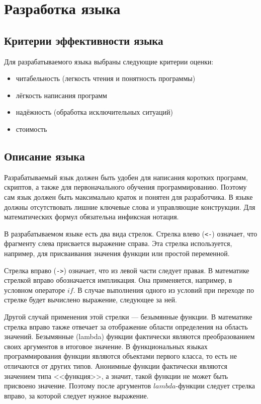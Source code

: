 \section{Разработка языка}
    \subsection{Критерии эффективности языка}
        Для разрабатываемого языка выбраны следующие критерии оценки:
        \begin{itemize}
            \item читабельность (легкость чтения и понятность программы)
            \item лёгкость написания программ
            \item надёжность (обработка исключительных ситуаций)
            \item стоимость
        \end{itemize}
    \subsection{Описание языка}
        Разрабатываемый язык должен быть удобен для написания коротких программ, скриптов, а также для первоначального обучения программированию.
        Поэтому сам язык должен быть максимально краток и понятен для разработчика.
        В языке должны отсутствовать лишние ключевые слова и управляющие конструкции.
        Для математических формул обязательна инфиксная нотация.

        В разрабатываемом языке есть два вида стрелок.
        Стрелка влево (\verb!<-!) означает, что фрагменту слева присвается выражение справа.
        Эта стрелка используется, например, для присваивания значения функции или простой переменной.

        Стрелка вправо (\verb!->!) означает, что из левой части следует правая.
        В математике стрелкой вправо обозначается импликация.
        Она применяется, например, в условном операторе $if$.
        В случае выполнения одного из условий при переходе по стрелке будет вычислено выражение, следующее за ней.
        
        Другой случай применения этой стрелки --- безымянные функции.
        В математике стрелка вправо также отвечает за отображение области определения на область значений.
        Безымянные (lambda) функции фактически являются преобразованием своих аргументов в итоговое значение.
        В функциональных языках программирования функции являются объектами первого класса, то есть не отличаются от других типов.
        Анонимные функции фактически являются значением типа <<функция>>, а значит, такой функции не может быть присвоено значение.
        Поэтому после аргументов $lambda$-функции следует стрелка вправо, за которой следует нужное выражение.

